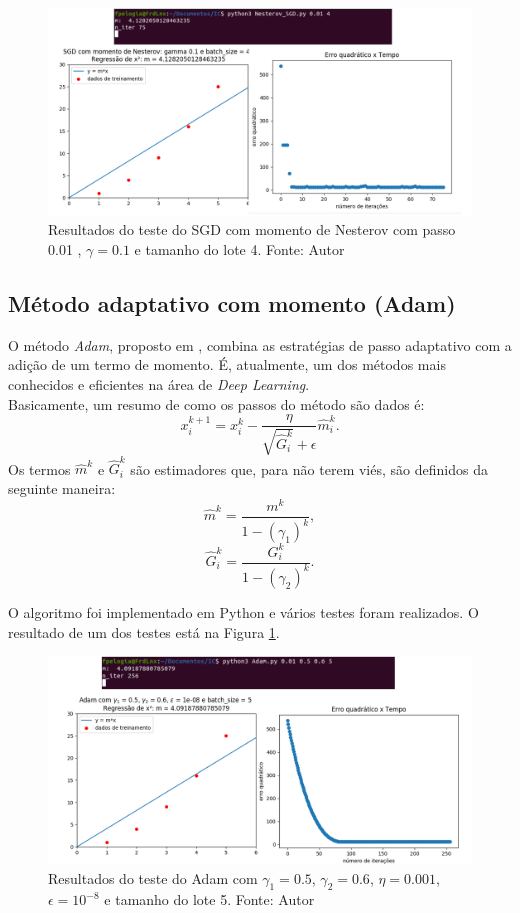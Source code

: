 \documentclass[a4paper,12pt]{article}
\begin{document}
\begin{figure}[H]
\centering 
\includegraphics[scale=0.5]{Figuras/Nesterov.png}
\caption{Resultados do teste do SGD com momento de Nesterov com passo 0.01 ,  $\gamma = 0.1$ e tamanho do lote 4. Fonte: Autor}
\end{figure}


\subsection{Método adaptativo com momento (Adam)}
O método \textit{Adam}, proposto em \cite{adampaper}, combina as estratégias de passo adaptativo com a adição de um termo de momento. É, atualmente, um dos métodos mais conhecidos e eficientes na área de \textit{Deep Learning}.\\

Basicamente, um resumo de como os passos do método são dados é:
$$x^{k+1}_i=x^k_i-\frac{\eta}{\sqrt{\hat{G}_i^k}+\epsilon}\hat{m}^k_i.$$
Os termos $\hat{m}^k$ e $\hat{G}_i^k$ são estimadores que, para não terem viés, são definidos da seguinte maneira:
$$\hat{m}^k=\frac{m^k}{1-(\gamma_1)^k},$$
$$\hat{G}_i^k=\frac{G_i^k}{1-(\gamma_2)^k}.$$

O algoritmo foi implementado em Python e vários testes foram realizados. O resultado de um dos testes está na Figura \ref{fig:Adam}.

\begin{figure}[H]
\centering 
\includegraphics[scale=0.5]{Figuras/Adam.png}
\caption{Resultados do teste do Adam com $\gamma_1=0.5$, $\gamma_2=0.6$, $\eta=0.001$, $\epsilon=10^{-8}$ e tamanho do lote 5. Fonte: Autor}
\label{fig:Adam}
\end{figure}
\end{document}
